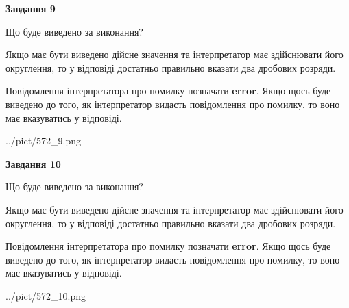 \documentclass[12pt, ukrainian]{article}
\begin{document}
{\begin {Large}
{\begin {center}\textbf{Завдання 9}\end {center}}\par
Що буде виведено за виконання? \par

Якщо має бути виведено дійсне значення та інтерпретатор має здійснювати його округлення, 
то у відповіді достатньо правильно вказати два дробових розряди.

Повідомлення інтерпретатора про помилку позначати \textbf{error}.
Якщо щось буде виведено до того, як інтерпретатор видасть повідомлення про помилку, 
то воно має вказуватись у відповіді. \par

\begin{center}
	{../pict/572_9.png}
\end{center}
\newpage

{\begin {center}\textbf{Завдання 10}\end {center}}\par
Що буде виведено за виконання? \par

Якщо має бути виведено дійсне значення та інтерпретатор має здійснювати його округлення, 
то у відповіді достатньо правильно вказати два дробових розряди.

Повідомлення інтерпретатора про помилку позначати \textbf{error}.
Якщо щось буде виведено до того, як інтерпретатор видасть повідомлення про помилку, 
то воно має вказуватись у відповіді. \par

\begin{center}
	{../pict/572_10.png}
\end{center}
\newpage

\end {Large}}
\end{document}

